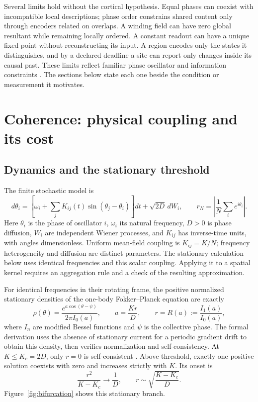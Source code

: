 \documentclass[12pt]{article}
\renewcommand{\cite}[1]{\citep{#1}}
\begin{document}
Several limits hold without the cortical hypothesis. Equal phases can coexist
with incompatible local descriptions; phase order constrains shared content
only through encoders related on overlaps. A winding field can have zero global
resultant while remaining locally ordered. A constant readout can have a unique
fixed point without reconstructing its input. A region encodes only the states it
distinguishes, and by a declared deadline a site can report only changes inside
its causal past. These limits reflect familiar phase
oscillator and information constraints \cite{acebron2005,ott2008,dorfler2014,breakspear2017}.
The sections below state each one beside the condition or measurement it
motivates.
\section{Coherence: physical coupling and its cost}
\label{sec:field}

\subsection{Dynamics and the stationary threshold}

The finite stochastic model is
\begin{equation}
 d\theta_i=\left[\omega_i+\sum_j K_{ij}(t)\sin(\theta_j-\theta_i)\right]dt
 +\sqrt{2D}\,dW_i,
 \qquad
 r_N=\left|\frac1N\sum_i e^{i\theta_i}\right|.
 \label{eq:kuramoto}
\end{equation}
Here $\theta_i$ is the phase of oscillator $i$, $\omega_i$ its natural frequency, $D>0$ is phase diffusion, $W_i$ are independent Wiener processes, and $K_{ij}$ has inverse-time units, with angles dimensionless. Uniform mean-field coupling is $K_{ij}=K/N$; frequency heterogeneity and diffusion are distinct parameters. The stationary calculation below uses identical frequencies and this scalar coupling. Applying it to a spatial kernel requires an aggregation rule and a check of the resulting approximation.

For identical frequencies in their rotating frame, the positive normalized stationary densities of the one-body Fokker--Planck equation are exactly
\begin{equation}
 \rho(\theta)=\frac{e^{a\cos(\theta-\psi)}}{2\pi I_0(a)},
 \qquad a=\frac{Kr}{D},\qquad
 r=R(a):=\frac{I_1(a)}{I_0(a)},
 \label{eq:selfconsistency}
\end{equation}
where $I_n$ are modified Bessel functions and $\psi$ is the collective phase. The formal derivation uses the absence of stationary current for a periodic gradient drift to obtain this density, then verifies normalization and self-consistency. At $K\leq K_c=2D$, only $r=0$ is self-consistent \cite{sakaguchi1988,strogatz1991}. Above threshold, exactly one positive solution coexists with zero and increases strictly with $K$. Its onset is
\begin{equation}
 \frac{r^2}{K-K_c}\longrightarrow\frac1D,
 \qquad r\sim\sqrt{\frac{K-K_c}{D}}.
 \label{eq:onset}
\end{equation}
Figure~\ref{fig:bifurcation} shows this stationary branch.
\end{document}
